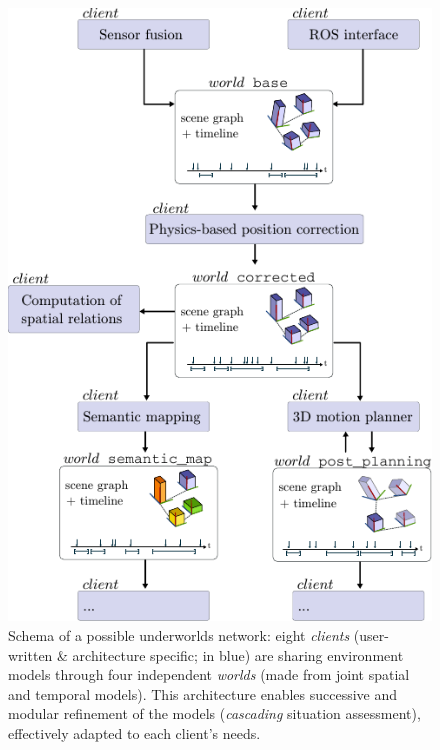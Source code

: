 \documentclass[letterpaper, 10pt, conference]{ieeeconf}
\newcommand{\uwds}{{\sc underworlds}\xspace}
\begin{document}
\begin{figure}[ht!]
    \centering
    \includegraphics[width=\linewidth]{overview}
    \caption{Schema of a possible \uwds network: eight \emph{clients} (user-written \&
    architecture specific; in blue) are sharing environment
    models through four independent \emph{worlds} (made from joint spatial and
    temporal models). This architecture enables successive and modular
    refinement of the models (\emph{cascading} situation assessment),
    effectively adapted to each client's needs.}

    \label{fig|scene}

\end{figure}
\end{document}
